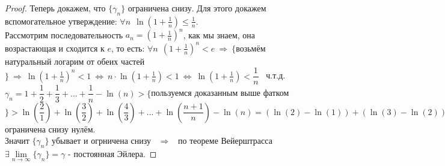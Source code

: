 \documentclass[12pt]{article}
\begin{document}
\begin{proof}
     Теперь докажем, что $\{\gamma_n\}$ ограничена снизу. Для этого докажем вспомогательное утверждение: $\forall n \ \  \ln\left(1+\frac{1}{n}\right) \leq \frac1n$. \\
     Рассмотрим последовательность $a_n = \left(1 + \frac1n\right)^n$, как мы знаем, она возрастающая и сходится к $e$, то есть: $\forall n  \ \ \left(1+\frac{1}{n}\right)^n < e \ \Rightarrow \ \{$возьмём натуральный логарим от обеих частей$\} \ \Rightarrow \ \ln\left(1 + \frac1n\right)^n < 1 \ \Leftrightarrow \ n \cdot \ln\left(1 + \frac1n\right) < 1 \ \Leftrightarrow \  \ln\left(1 + \frac1n\right) < \dfrac{1}{n}$ \ ч.т.д. \\
     $\gamma_n = 1 + \dfrac12 + \dfrac13 + ... + \dfrac1n - \ln(n) > \{$пользуемся доказанным выше фатком$\} >  \ln\left( \dfrac21 \right) + \ln\left( \dfrac32 \right) + \ln\left( \dfrac43 \right) + ... + \ln\left( \dfrac{n+1}n \right) - \ln(n) = (\ln(2) - \ln(1)) + (\ln(3) - \ln(2)) + (\ln(4) - \ln(3)) + ... + (\ln(n+1) - \ln(n)) - \ln(n) = \ln(n+1) - \ln(n) = \ln\left( \dfrac{n+1}{n} \right) = \ln\left( 1+ \dfrac{1}{n} \right) > 0 \ \Rightarrow \ \{\gamma_n\}$ ограничена снизу нулём.  \\
     Значит $\{\gamma_n\}$ убывает и огрничена снизу \  $\Rightarrow$ \ по теореме Вейерштрасса $\exists \lim\limits_{n \to \infty} \{\gamma_n\} = \gamma$ - постоянная Эйлера. 
 \end{proof}
 
\end{document}
